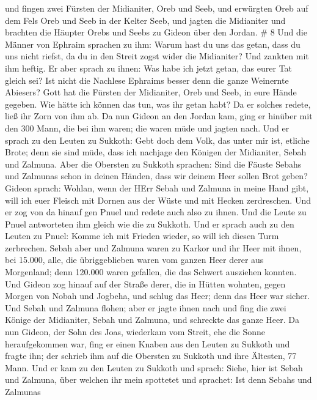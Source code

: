  und fingen zwei Fürsten der Midianiter, Oreb und Seeb, und
erwürgten Oreb auf dem Fels Oreb und Seeb in der Kelter Seeb, und jagten
die Midianiter und brachten die Häupter Orebs und Seebs zu Gideon über
den Jordan. \# 8  Und die Männer von Ephraim sprachen zu
ihm: Warum hast du uns das getan, dass du uns nicht riefst, da du in den
Streit zogst wider die Midianiter? Und zankten mit ihm heftig.
 Er aber sprach zu ihnen: Was habe ich jetzt getan, das
eurer Tat gleich sei? Ist nicht die Nachlese Ephraims besser denn die
ganze Weinernte Abiesers?  Gott hat die Fürsten der
Midianiter, Oreb und Seeb, in eure Hände gegeben. Wie hätte ich können
das tun, was ihr getan habt? Da er solches redete, ließ ihr Zorn von ihm
ab.  Da nun Gideon an den Jordan kam, ging er hinüber mit
den 300 Mann, die bei ihm waren; die waren müde und jagten nach.
 Und er sprach zu den Leuten zu Sukkoth: Gebt doch dem Volk,
das unter mir ist, etliche Brote; denn sie sind müde, dass ich nachjage
den Königen der Midianiter, Sebah und Zalmuna.  Aber die
Obersten zu Sukkoth sprachen: Sind die Fäuste Sebahs und Zalmunas schon
in deinen Händen, dass wir deinem Heer sollen Brot geben? 
Gideon sprach: Wohlan, wenn der HErr Sebah und Zalmuna in meine Hand
gibt, will ich euer Fleisch mit Dornen aus der Wüste und mit Hecken
zerdreschen.  Und er zog von da hinauf gen Pnuel und redete
auch also zu ihnen. Und die Leute zu Pnuel antworteten ihm gleich wie
die zu Sukkoth.  Und er sprach auch zu den Leuten zu Pnuel:
Komme ich mit Frieden wieder, so will ich diesen Turm zerbrechen.
 Sebah aber und Zalmuna waren zu Karkor und ihr Heer mit
ihnen, bei 15.000, alle, die übriggeblieben waren vom ganzen Heer derer
aus Morgenland; denn 120.000 waren gefallen, die das Schwert ausziehen
konnten.  Und Gideon zog hinauf auf der Straße derer, die
in Hütten wohnten, gegen Morgen von Nobah und Jogbeha, und schlug das
Heer; denn das Heer war sicher.  Und Sebah und Zalmuna
flohen; aber er jagte ihnen nach und fing die zwei Könige der
Midianiter, Sebah und Zalmuna, und schreckte das ganze Heer.
 Da nun Gideon, der Sohn des Joas, wiederkam vom Streit,
ehe die Sonne heraufgekommen war,  fing er einen Knaben aus
den Leuten zu Sukkoth und fragte ihn; der schrieb ihm auf die Obersten
zu Sukkoth und ihre Ältesten, 77 Mann.  Und er kam zu den
Leuten zu Sukkoth und sprach: Siehe, hier ist Sebah und Zalmuna, über
welchen ihr mein spottetet und sprachet: Ist denn Sebahs und Zalmunas
